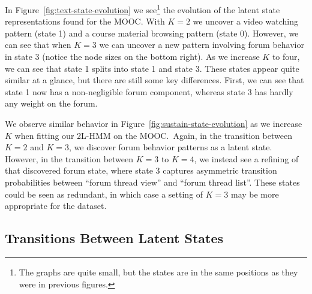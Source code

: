 In Figure~\ref{fig:text-state-evolution} we see\footnote{The graphs are
quite small, but the states are in the same positions as they were in
previous figures.} the evolution of the latent state
representations found for the \textretrieval{} MOOC.  With $K=2$ we uncover
a video watching pattern (state 1) and a course material browsing pattern
(state 0). However, we can see that when $K=3$ we can uncover a new pattern
involving forum behavior in state 3 (notice the node sizes on the bottom
right). As we increase $K$ to four, we can see that state 1 splits into
state 1 and state 3. These states appear quite similar at a glance, but
there are still some key differences. First, we can see that state 1 now
has a non-negligible forum component, whereas state 3 has hardly any weight
on the forum.

We observe similar behavior in Figure~\ref{fig:sustain-state-evolution}
as we increase $K$ when fitting our 2L-HMM on the \sustain{} MOOC.\ Again,
in the transition between $K=2$ and $K=3$, we discover forum behavior
patterns as a latent state. However, in the transition between $K=3$ to
$K=4$, we instead see a refining of that discovered forum state, where
state 3 captures asymmetric transition probabilities between ``forum thread
view'' and ``forum thread list''. These states could be seen as redundant,
in which case a  setting of $K=3$ may be more appropriate for the
\sustain{} dataset.

\subsection{Transitions Between Latent States}

